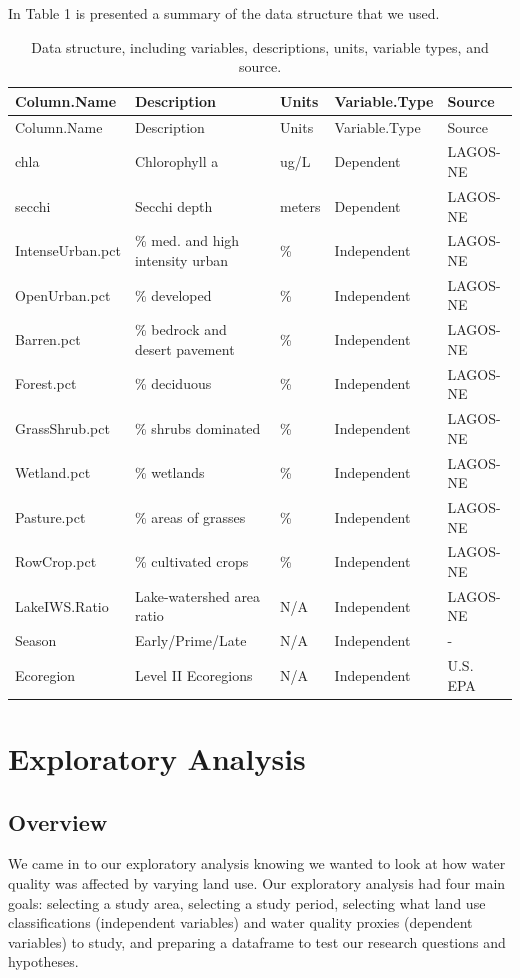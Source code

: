\documentclass[12pt,]{article}
\begin{document}
In Table 1 is presented a summary of the data structure that we used.

\begin{longtable}[]{@{}lllll@{}}
\caption{Data structure, including variables, descriptions, units,
variable types, and source.}\tabularnewline
\toprule
Column.Name & Description & Units & Variable.Type &
Source\tabularnewline
\midrule
\endfirsthead
\toprule
Column.Name & Description & Units & Variable.Type &
Source\tabularnewline
\midrule
\endhead
chla & Chlorophyll a & ug/L & Dependent & LAGOS-NE\tabularnewline
secchi & Secchi depth & meters & Dependent & LAGOS-NE\tabularnewline
IntenseUrban.pct & \% med. and high intensity urban & \% & Independent &
LAGOS-NE\tabularnewline
OpenUrban.pct & \% developed & \% & Independent &
LAGOS-NE\tabularnewline
Barren.pct & \% bedrock and desert pavement & \% & Independent &
LAGOS-NE\tabularnewline
Forest.pct & \% deciduous & \% & Independent & LAGOS-NE\tabularnewline
GrassShrub.pct & \% shrubs dominated & \% & Independent &
LAGOS-NE\tabularnewline
Wetland.pct & \% wetlands & \% & Independent & LAGOS-NE\tabularnewline
Pasture.pct & \% areas of grasses & \% & Independent &
LAGOS-NE\tabularnewline
RowCrop.pct & \% cultivated crops & \% & Independent &
LAGOS-NE\tabularnewline
LakeIWS.Ratio & Lake-watershed area ratio & N/A & Independent &
LAGOS-NE\tabularnewline
Season & Early/Prime/Late & N/A & Independent & -\tabularnewline
Ecoregion & Level II Ecoregions & N/A & Independent & U.S.
EPA\tabularnewline
\bottomrule
\end{longtable}

\newpage

\hypertarget{exploratory-analysis}{%
\section{Exploratory Analysis}\label{exploratory-analysis}}

\hypertarget{overview}{%
\subsection{Overview}\label{overview}}

We came in to our exploratory analysis knowing we wanted to look at how
water quality was affected by varying land use. Our exploratory analysis
had four main goals: selecting a study area, selecting a study period,
selecting what land use classifications (independent variables) and
water quality proxies (dependent variables) to study, and preparing a
dataframe to test our research questions and hypotheses.
\end{document}
